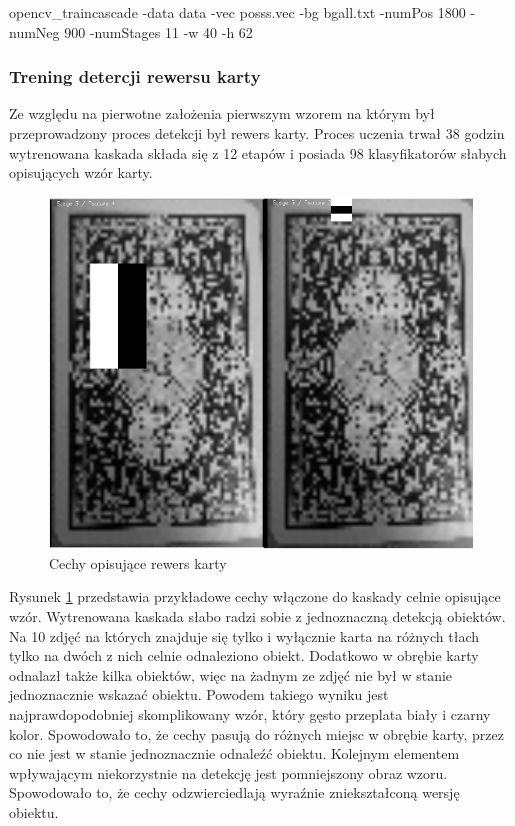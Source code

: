 \documentclass{article}
\numberwithin{equation}{section}
\begin{document}
opencv\_traincascade -data data -vec posss.vec -bg bgall.txt -numPos 1800 -numNeg 900 -numStages 11 -w 40 -h 62

\subsubsection{Trening detercji rewersu karty}

Ze względu na pierwotne założenia pierwszym wzorem na którym był przeprowadzony proces detekcji był rewers karty. Proces uczenia trwał 38 godzin wytrenowana kaskada składa się z 12 etapów i posiada 98 klasyfikatorów słabych opisujących wzór karty.

\begin{figure}[H]
\centering
\includegraphics[scale=0.2]{cechyRewers.png}
\caption{Cechy opisujące rewers karty}
\label{fig:cechyRewers}
\end{figure}

Rysunek \ref{fig:cechyRewers} przedstawia przykładowe cechy włączone do kaskady celnie opisujące wzór. Wytrenowana kaskada słabo radzi sobie z jednoznaczną detekcją obiektów. Na 10 zdjęć na których znajduje się tylko i wyłącznie karta na różnych tłach tylko na dwóch z nich celnie odnaleziono obiekt. Dodatkowo w obrębie karty odnalazł także kilka obiektów, więc na żadnym ze zdjęć nie był w stanie jednoznacznie wskazać obiektu. Powodem takiego wyniku jest najprawdopodobniej skomplikowany wzór, który gęsto przeplata biały i czarny kolor. Spowodowało to, że cechy pasują do różnych miejsc w obrębie karty, przez co nie jest w stanie jednoznacznie odnaleźć obiektu. Kolejnym elementem wpływającym niekorzystnie na detekcję jest pomniejszony obraz wzoru. Spowodowało to, że cechy odzwierciedlają wyraźnie zniekształconą wersję obiektu.
\end{document}
